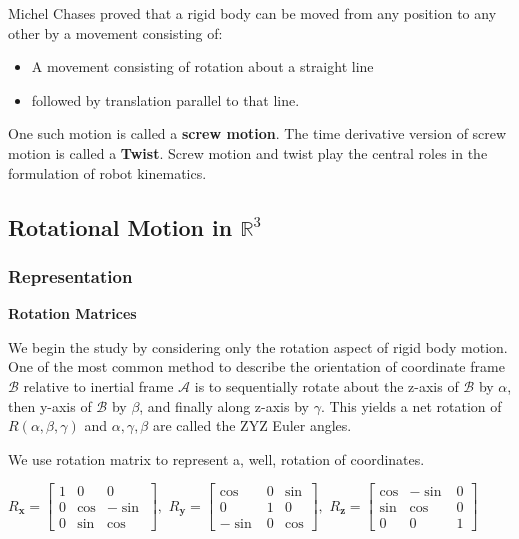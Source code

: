 \documentclass[letterpaper]{article}
\begin{document}
Michel Chases proved that a rigid body can be moved from any position to any other by a movement consisting of:\vspace{-0.5em}
\begin{itemize}
    \item A movement consisting of rotation about a straight line\vspace{-1em}
    \item followed by translation parallel to that line. \vspace{-0.5em}
\end{itemize}
One such motion is called a \textbf{screw motion}. The time derivative version of screw motion is called a
\textbf{Twist}. Screw motion and twist play the central roles in the formulation of robot kinematics. 

\subsection{Rotational Motion in $\mathbb{R}^3$}

\subsubsection{Representation}
\textbf{Rotation Matrices}

We begin the study by considering only the rotation aspect of rigid body motion. 
One of the most common method to describe the orientation of coordinate frame $\mathcal{B}$ relative to
inertial frame $\mathcal{A}$ is to sequentially rotate about the z-axis of $\mathcal{B}$ by $\alpha$, 
then y-axis of $\mathcal{B}$ by $\beta$, and finally along z-axis by $\gamma$. This yields a net rotation
of $R(\alpha, \beta, \gamma)$ and $\alpha, \gamma, \beta$ are called the ZYZ Euler angles. 

We use rotation matrix to represent a, well, rotation of coordinates. 

$R_{\mathbf{x}} = \begin{bmatrix}
  1 & 0 & 0\\
  0 &\cos & -\sin\\
  0 &\sin & \cos
\end{bmatrix}, 
$
$
R_{\mathbf{y}} = \begin{bmatrix}
\cos & 0 & \sin\\
0 & 1 & 0\\
-\sin & 0 & \cos
\end{bmatrix}, 
$
$
R_{\mathbf{z}} = \begin{bmatrix}
  \cos & -\sin & 0\\
  \sin & \cos & 0\\
  0 & 0 & 1
\end{bmatrix}$
\vspace{6pt}
\end{document}
